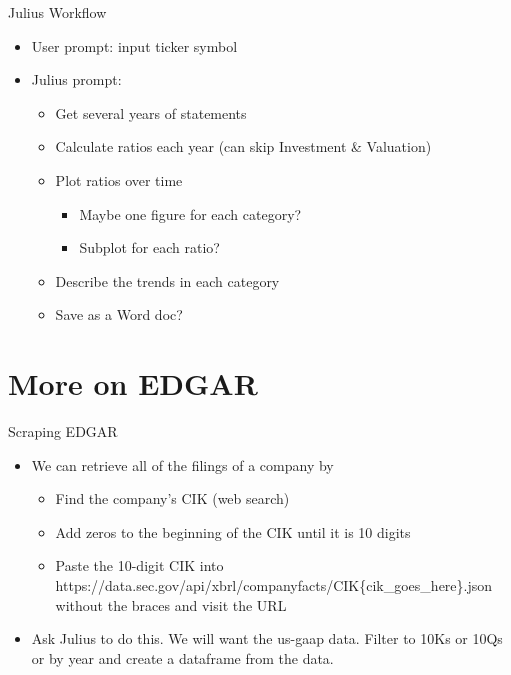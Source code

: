 \documentclass[10pt]{beamer}
\begin{document}
\begin{frame}{Julius Workflow}
\begin{itemize}
    \item User prompt: input ticker symbol
    \item Julius prompt:
\begin{itemize}
\item Get several years of statements
\item Calculate ratios each year (can skip Investment \& Valuation)
\item Plot ratios over time
\begin{itemize}
\item Maybe one figure for each category?
\item Subplot for each ratio?
\end{itemize}
\item Describe the trends in each category
\item Save as a Word doc?
\end{itemize}
\end{itemize}
\end{frame}

\section{More on EDGAR}

\begin{frame}{Scraping EDGAR}
\begin{itemize}
\item We can retrieve all of the filings of a company by 
\begin{itemize}
\item Find the company's CIK (web search)
\item Add zeros to the beginning of the CIK until it is 10 digits
\item Paste the 10-digit CIK into https://data.sec.gov/api/xbrl/companyfacts/CIK\{cik\_goes\_here\}.json without the braces and visit the URL
\end{itemize}
\item Ask Julius to do this.  We will want the us-gaap data.  Filter to 10Ks or 10Qs or by year and create a dataframe from the data.
\end{itemize}
\end{frame}
\end{document}
